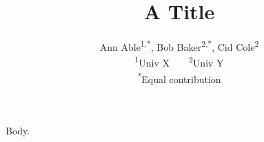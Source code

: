 \documentclass{article}
\begin{document}
\title{A Title}
\author{Ann Able\textsuperscript{1,*}, Bob Baker\textsuperscript{2,*}, Cid Cole\textsuperscript{2} \\
\textsuperscript{1}Univ X~~~~\textsuperscript{2}Univ Y \\
\textsuperscript{*}Equal contribution}
\maketitle
Body.
\end{document}
